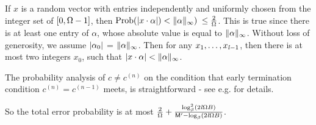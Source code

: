 %
If $x$ is a random vector with entries 
independently and uniformly chosen from the integer set of $[0, \Omega-1]$,
then $\mbox{Prob} (|x \cdot \alpha|) < \|\alpha\|_\infty)$
$\leq \frac{2}{\Omega}$.
This is true since
there is at least one entry of $\alpha$, whose absolute value is
equal to $\|\alpha\|_\infty$.
Without loss of generosity, we assume $|\alpha_0|$ = $\|\alpha\|_\infty$.
Then for any $x_1, \ldots, x_{\mathit l-1}$, then there is at most two integers $x_0$, 
such that $|x \cdot \alpha| < \|\alpha\|_\infty$.

The probability analysis of $c \not= c^{(n)}$ 
on the condition that early termination condition $c^{(n)} = c^{(n-1)}$ meets,
is straightforward - see e.g. \cite[Theorem 1.]{Kaltofen02} for details.

So the total error probability is at most 
$\frac{2}{\Omega} +
\frac{\log^2_{\beta}(2\mathit l \Omega B)}
{\mathsf M^\prime - \log_{\beta}(2\mathit l \Omega B)}$.
%
%
%
%
%
\QED
